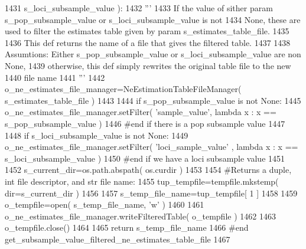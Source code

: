 \begin{DoxyCode}
1431                                                             s\_loci\_subsample\_value ):
1432     \textcolor{stringliteral}{'''}
1433 \textcolor{stringliteral}{    If the value of sither param s\_pop\_subsample\_value or s\_loci\_subsample\_value is not }
1434 \textcolor{stringliteral}{    None, these are used to filter the estimates table given by param s\_estimates\_table\_file.}
1435 \textcolor{stringliteral}{}
1436 \textcolor{stringliteral}{    This def returns the name of a file that gives the filtered table.}
1437 \textcolor{stringliteral}{}
1438 \textcolor{stringliteral}{    Assumtions: Either s\_pop\_subsample\_value or s\_loci\_subsample\_value are non None,}
1439 \textcolor{stringliteral}{                otherwise, this def simply rewrites the original table file to the new}
1440 \textcolor{stringliteral}{                file name}
1441 \textcolor{stringliteral}{    '''}
1442     o\_ne\_estimates\_file\_manager=NeEstimationTableFileManager( s\_estimates\_table\_file )
1443 
1444     \textcolor{keywordflow}{if} s\_pop\_subsample\_value \textcolor{keywordflow}{is} \textcolor{keywordflow}{not} \textcolor{keywordtype}{None}:
1445         o\_ne\_estimates\_file\_manager.setFilter( \textcolor{stringliteral}{'sample\_value'}, \textcolor{keyword}{lambda} x : x == s\_pop\_subsample\_value ) 
1446     \textcolor{comment}{#end if there is a pop subsample value}
1447 
1448     \textcolor{keywordflow}{if} s\_loci\_subsample\_value \textcolor{keywordflow}{is} \textcolor{keywordflow}{not} \textcolor{keywordtype}{None}:
1449         o\_ne\_estimates\_file\_manager.setFilter( \textcolor{stringliteral}{'loci\_sample\_value'} , \textcolor{keyword}{lambda} x : x == s\_loci\_subsample\_value
       )
1450     \textcolor{comment}{#end if we have a loci subsample value}
1451 
1452     s\_current\_dir=os.path.abspath( os.curdir )
1453 
1454     \textcolor{comment}{#Returns a duple, int file descriptor, and str file name:}
1455     tup\_tempfile=tempfile.mkstemp( dir=s\_current\_dir )
1456 
1457     s\_temp\_file\_name=tup\_tempfile[ 1 ]
1458 
1459     o\_tempfile=open( s\_temp\_file\_name, \textcolor{stringliteral}{'w'} )
1460 
1461     o\_ne\_estimates\_file\_manager.writeFilteredTable( o\_tempfile )
1462 
1463     o\_tempfile.close()
1464 
1465     \textcolor{keywordflow}{return} s\_temp\_file\_name
1466 \textcolor{comment}{#end get\_subsample\_value\_filtered\_ne\_estimates\_table\_file}
1467 
\end{DoxyCode}
